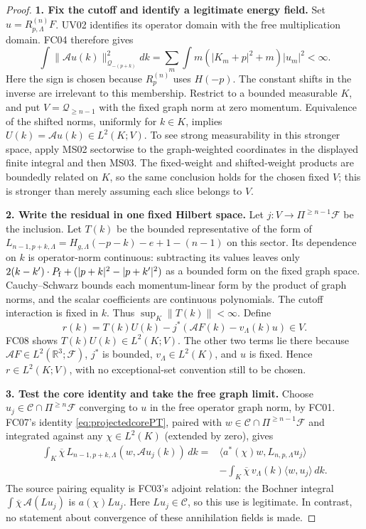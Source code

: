 \documentclass[11pt,a4paper]{article}
\theoremstyle{remark}\newtheorem{remark}[theorem]{Remark}
\newcommand{\R}{\mathbb R}\newcommand{\C}{\mathbb C}\newcommand{\N}{\mathbb N}
\newcommand{\F}{\mathcal F}\newcommand{\Q}{\mathcal Q}\newcommand{\HH}{\mathcal H}
\begin{document}
\begin{proof}
\textbf{1. Fix the cutoff and identify a legitimate energy field.}
Set $u=R_{p,\Lambda}^{(n)}F$. UV02 identifies its operator domain with the free multiplication domain. FC04 therefore gives
\[
 \int\|\mathcal Au(k)\|_{\Q_{-(p+k)}}^2dk
 =\sum_m\int m(|K_m+p|^2+m)|u_m|^2<\infty.
\]
Here the sign is chosen because $R_p^{(n)}$ uses $H(-p)$. The constant shifts in the inverse are irrelevant to this membership. Restrict to a bounded measurable $K$, and put $V=\Q_{\geq n-1}$ with the fixed graph norm at zero momentum. Equivalence of the shifted norms, uniformly for $k\in K$, implies $U(k)=\mathcal Au(k)\in L^2(K;V)$. To see strong measurability in this stronger space, apply MS02 sectorwise to the graph-weighted coordinates in the displayed finite integral and then MS03. The fixed-weight and shifted-weight products are boundedly related on $K$, so the same conclusion holds for the chosen fixed $V$; this is stronger than merely assuming each slice belongs to $V$.

\textbf{2. Write the residual in one fixed Hilbert space.}
Let $j:V\to\Pi^{\geq n-1}\F$ be the inclusion. Let $T(k)$ be the bounded representative of the form of
$L_{n-1,p+k,\Lambda}=H_{g,\Lambda}(-p-k)-e+1-(n-1)$ on this sector. Its dependence on $k$ is operator-norm continuous: subtracting its values leaves only
$2(k-k')\cdot P_{\rm f}+(|p+k|^2-|p+k'|^2)$ as a bounded form on the fixed graph space. Cauchy--Schwarz bounds each momentum-linear form by the product of graph norms, and the scalar coefficients are continuous polynomials. The cutoff interaction is fixed in $k$. Thus $\sup_K\|T(k)\|<\infty$. Define
\[
 r(k)=T(k)U(k)-j^*(\mathcal AF(k)-v_\Lambda(k)u)\in V.
\]
FC08 shows $T(k)U(k)\in L^2(K;V)$. The other two terms lie there because $\mathcal AF\in L^2(\R^3;\F)$, $j^*$ is bounded, $v_\Lambda\in L^2(K)$, and $u$ is fixed. Hence $r\in L^2(K;V)$, with no exceptional-set convention still to be chosen.

\textbf{3. Test the core identity and take the free graph limit.}
Choose $u_j\in\mathscr C\cap\Pi^{\geq n}\F$ converging to $u$ in the free operator graph norm, by FC01. FC07's identity \eqref{eq:projectedcorePT}, paired with $w\in\mathscr C\cap\Pi^{\geq n-1}\F$ and integrated against any $\chi\in L^2(K)$ (extended by zero), gives
\begin{align*}
 \int_K\overline\chi\,
    L_{n-1,p+k,\Lambda}(w,\mathcal Au_j(k))\,dk
 ={}&\langle a^*(\chi)w,L_{n,p,\Lambda}u_j\rangle\\
 &-\int_K\overline\chi\,v_\Lambda(k)\langle w,u_j\rangle\,dk.
\end{align*}
The source pairing equality is FC03's adjoint relation: the Bochner integral $\int\overline\chi\,\mathcal A(Lu_j)$ is $a(\chi)Lu_j$. Here $Lu_j\in\mathscr C$, so this use is legitimate. In contrast, no statement about convergence of these annihilation fields is made.


\end{proof}
\end{document}
